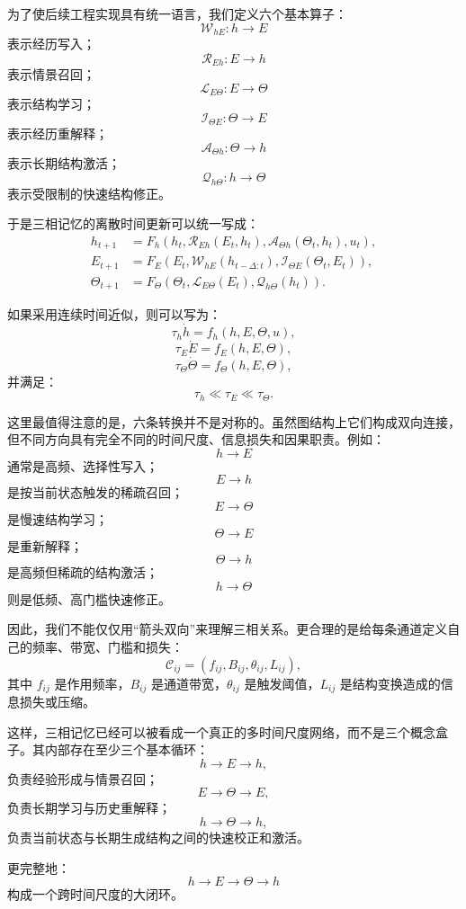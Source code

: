 为了使后续工程实现具有统一语言，我们定义六个基本算子：
\[
\mathcal W_{hE}:h\rightarrow E
\]
表示经历写入；
\[
\mathcal R_{Eh}:E\rightarrow h
\]
表示情景召回；
\[
\mathcal L_{E\Theta}:E\rightarrow\Theta
\]
表示结构学习；
\[
\mathcal I_{\Theta E}:\Theta\rightarrow E
\]
表示经历重解释；
\[
\mathcal A_{\Theta h}:\Theta\rightarrow h
\]
表示长期结构激活；
\[
\mathcal Q_{h\Theta}:h\rightarrow\Theta
\]
表示受限制的快速结构修正。

于是三相记忆的离散时间更新可以统一写成：
\[
\begin{aligned}
h_{t+1}
&=
F_h
\left(
h_t,
\mathcal R_{Eh}(E_t,h_t),
\mathcal A_{\Theta h}(\Theta_t,h_t),
u_t
\right),\\
E_{t+1}
&=
F_E
\left(
E_t,
\mathcal W_{hE}(h_{t-\Delta:t}),
\mathcal I_{\Theta E}(\Theta_t,E_t)
\right),\\
\Theta_{t+1}
&=
F_\Theta
\left(
\Theta_t,
\mathcal L_{E\Theta}(E_t),
\mathcal Q_{h\Theta}(h_t)
\right).
\end{aligned}
\]

如果采用连续时间近似，则可以写为：
\[
\tau_h\dot h
=
f_h(h,E,\Theta,u),
\]
\[
\tau_E\dot E
=
f_E(h,E,\Theta),
\]
\[
\tau_\Theta\dot\Theta
=
f_\Theta(h,E,\Theta),
\]
并满足：
\[
\boxed{
\tau_h\ll\tau_E\ll\tau_\Theta.
}
\]

这里最值得注意的是，六条转换并不是对称的。虽然图结构上它们构成双向连接，但不同方向具有完全不同的时间尺度、信息损失和因果职责。例如：
\[
h\rightarrow E
\]
通常是高频、选择性写入；
\[
E\rightarrow h
\]
是按当前状态触发的稀疏召回；
\[
E\rightarrow\Theta
\]
是慢速结构学习；
\[
\Theta\rightarrow E
\]
是重新解释；
\[
\Theta\rightarrow h
\]
是高频但稀疏的结构激活；
\[
h\rightarrow\Theta
\]
则是低频、高门槛快速修正。

因此，我们不能仅仅用“箭头双向”来理解三相关系。更合理的是给每条通道定义自己的频率、带宽、门槛和损失：
\[
\mathcal C_{ij}
=
\left(
f_{ij},
B_{ij},
\theta_{ij},
L_{ij}
\right),
\]
其中 $f_{ij}$ 是作用频率，$B_{ij}$ 是通道带宽，$\theta_{ij}$ 是触发阈值，$L_{ij}$ 是结构变换造成的信息损失或压缩。

这样，三相记忆已经可以被看成一个真正的多时间尺度网络，而不是三个概念盒子。其内部存在至少三个基本循环：
\[
h\rightarrow E\rightarrow h,
\]
负责经验形成与情景召回；
\[
E\rightarrow\Theta\rightarrow E,
\]
负责长期学习与历史重解释；
\[
h\rightarrow\Theta\rightarrow h,
\]
负责当前状态与长期生成结构之间的快速校正和激活。

更完整地：
\[
\boxed{
h
\rightarrow
E
\rightarrow
\Theta
\rightarrow
h
}
\]
构成一个跨时间尺度的大闭环。

